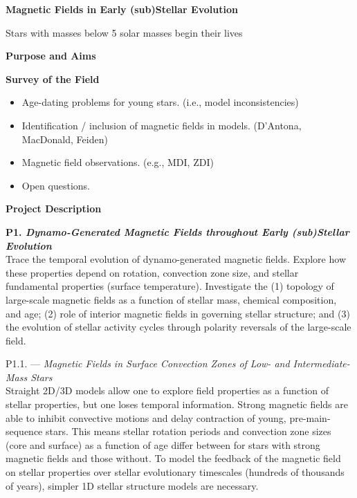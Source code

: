 \documentclass[12pt,a4paper]{article}
\begin{document}
\begin{center}
	{\bf {\LARGE Magnetic Fields in Early (sub)Stellar Evolution}} 
\end{center}
\vspace{\baselineskip}

Stars with masses below 5 solar masses begin their lives

{\bf \large Purpose and Aims}

\clearpage

{\bf \large Survey of the Field}
\begin{itemize}
	\item Age-dating problems for young stars. (i.e., model inconsistencies)
	\item Identification / inclusion of magnetic fields in models. (D'Antona, MacDonald, Feiden)
	\item Magnetic field observations. (e.g., MDI, ZDI)
	\item Open questions.
\end{itemize}



{\bf \large Project Description}

\textbf{P1. \emph{Dynamo-Generated Magnetic Fields throughout Early (sub)Stellar Evolution}} \\
Trace the temporal evolution of dynamo-generated magnetic fields. Explore how these properties depend on rotation, convection zone size, and stellar fundamental properties (surface temperature). Investigate the (1) topology of large-scale magnetic fields as a function of stellar mass, chemical composition, and age; (2) role of interior magnetic fields in governing stellar structure; and (3) the evolution of stellar activity cycles through polarity reversals of the large-scale field.

P1.1. --- \emph{Magnetic Fields in Surface Convection Zones of Low- and Intermediate-Mass Stars} \\
Straight 2D/3D models allow one to explore field properties as a function of stellar properties, but one loses temporal information. Strong magnetic fields are able to inhibit convective motions and delay contraction of young, pre-main-sequence stars. This means stellar rotation periods and convection zone sizes (core and surface) as a function of age differ between for stars with strong magnetic fields and those without. To model the feedback of the magnetic field on stellar properties over stellar evolutionary timescales (hundreds of thousands of years), simpler 1D stellar structure models are necessary. 
\end{document}
